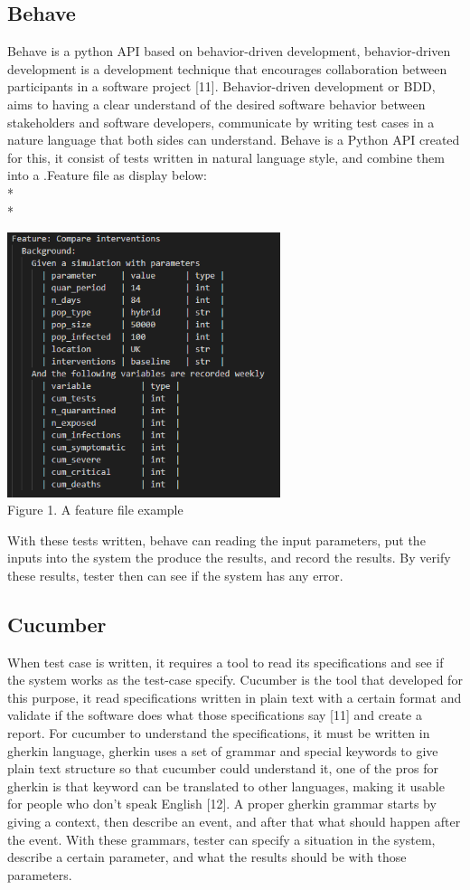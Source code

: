 \subsection{Behave}
Behave is a python API based on behavior-driven development, behavior-driven development is a development technique that encourages collaboration between participants in a software project [11]. Behavior-driven development or BDD, aims to having a clear understand of the desired software behavior between stakeholders and software developers, communicate by writing test cases in a nature language that both sides can understand. Behave is a Python API created for this, it consist of tests written in natural language style, and combine them into a .Feature file as display below: \\*\\*
\begin{center}
\includegraphics[width=8cm]{images/featureFile.png}\\
Figure 1. A feature file example
\end{center}
With these tests written, behave can reading the input parameters, put the inputs into the system the produce the results, and record the results. By verify these results, tester then can see if the system has any error. 
\subsection{Cucumber}
When test case is written, it requires a tool to read its specifications and see if the system works as the test-case specify. Cucumber is the tool that developed for this purpose, it read specifications written in plain text with a certain format and validate if the software does what those specifications say [11] and create a report. For cucumber to understand the specifications, it must be written in gherkin language, gherkin uses a set of grammar and special keywords to give plain text structure so that cucumber could understand it, one of the pros for gherkin is that keyword can be translated to other languages, making it usable for people who don’t speak English [12]. A proper gherkin grammar starts by giving a context, then describe an event, and after that what should happen after the event. With these grammars, tester can specify a situation in the system, describe a certain parameter, and what the results should be with those parameters.
